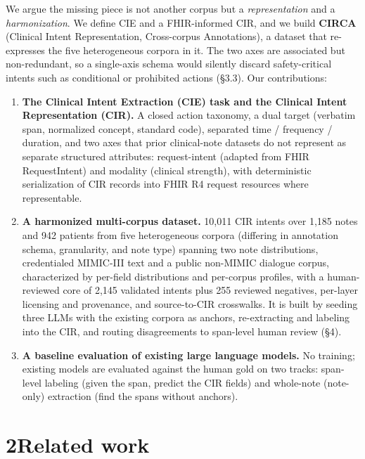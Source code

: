 We argue the missing piece is not another corpus but a \emph{representation} and a \emph{harmonization}. We define CIE and a FHIR-informed CIR, and we build \textbf{CIRCA} (Clinical Intent Representation, Cross-corpus Annotations), a dataset that re-expresses the five heterogeneous corpora in it. The two axes are associated but non-redundant, so a single-axis schema would silently discard safety-critical intents such as conditional or prohibited actions (§3.3). Our contributions:

\begin{enumerate}
\tightlist
\item
  \textbf{The Clinical Intent Extraction (CIE) task and the Clinical Intent Representation (CIR).} A closed action taxonomy, a dual target (verbatim span, normalized concept, standard code), separated time / frequency / duration, and two axes that prior clinical-note datasets do not represent as separate structured attributes: request-intent (adapted from FHIR RequestIntent) and modality (clinical strength), with deterministic serialization of CIR records into FHIR R4 request resources where representable.
\item
  \textbf{A harmonized multi-corpus dataset.} 10,011 CIR intents over 1,185 notes and 942 patients from five heterogeneous corpora (differing in annotation schema, granularity, and note type) spanning two note distributions, credentialed MIMIC-III text and a public non-MIMIC dialogue corpus, characterized by per-field distributions and per-corpus profiles, with a human-reviewed core of 2,145 validated intents plus 255 reviewed negatives, per-layer licensing and provenance, and source-to-CIR crosswalks. It is built by seeding three LLMs with the existing corpora as anchors, re-extracting and labeling into the CIR, and routing disagreements to span-level human review (§4).
\item
  \textbf{A baseline evaluation of existing large language models.} No training; existing models are evaluated against the human gold on two tracks: span-level labeling (given the span, predict the CIR fields) and whole-note (note-only) extraction (find the spans without anchors).
\end{enumerate}

\section{\texorpdfstring{{2}Related work}{2Related work}}\label{related-work}

